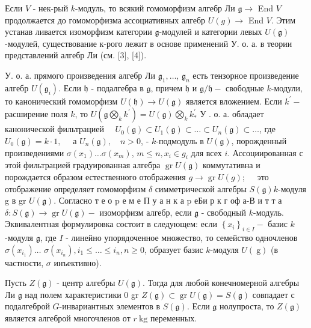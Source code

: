 \documentclass[10pt]{article}
\begin{document}
Если $V$ - нек-рый $k$-модуль, то всякий гомоморфизм алгебр Ли $\mathfrak{g} \rightarrow$ End $V$ продолжается до гомоморфизма ассоциативных алгебр $U(g) \rightarrow$ End $V$. Этим устанав ливается изоморфизм категории $\mathfrak{g}$-модулей и категории левых $U(\mathfrak{g})$-модулей, существование к-рого лежит в основе применений У. о. а. в теории представлений алгебр Ли (см. [3], [4]).



У. о. а. прямого произведения алгебр Ли $\mathfrak{g}_{1}, \ldots$, $\mathfrak{g}_{n}$ есть тензорное произведение алгебр $U\left(\mathfrak{g}_{i}\right)$. Если $\mathfrak{h}$ - подалгебра в $\mathfrak{g}$, причем $\mathfrak{h}$ и $\mathfrak{g} / \mathfrak{h}-$ свободные $k$-модули, то канонический гомоморфизм $U(\mathfrak{h}) \rightarrow U(\mathfrak{g})$ является вложением. Если $k^{\prime}-$ расширение поля $k$, то $U\left(\mathfrak{g} \bigotimes_{k} k^{\prime}\right)=U(\mathfrak{g}) \bigotimes_{k} k_{*}^{\prime}$ У . о. а. обладает канонической фильтрацией $\quad U_{0}(\mathfrak{g}) \subset U_{1}(\mathfrak{g}) \subset \ldots \subset U_{n}(\mathfrak{g}) \subset \ldots$, где $U_{0}(\mathfrak{g})=k \cdot 1, \quad$ а $U_{n}(\mathfrak{g}), \quad n>0$, - $k$-подмодуль в $U(\mathfrak{g})$, порожденный произведениями $\sigma\left(x_{1}\right) \ldots \sigma\left(x_{m}\right)$, $m \leqslant n, x_{i} \in g_{i}$ для всех $i$. Ассоциированная с этой фильтрацией градуированная алгебра $\operatorname{gr} U(\mathfrak{g})$ коммутативна и порождается образом естественного отображения $g \rightarrow \operatorname{gr} U(g) ; \quad$ это отображение определяет гомоморфизм $\delta$ симметрической алгебры $S(\mathfrak{g}) k$-модуля g в gr $U(\mathfrak{g})$. Согласно т е о p е м е П у а н к а p еБи р к г оф а-В и т т а $\delta: S(\mathfrak{g}) \rightarrow \operatorname{gr} U(\mathfrak{g})-$ изоморфизм алгебр, если $\mathfrak{g}$ - свободный $k$-модуль. Эквивалентная формулировка состоит в следующем: если $\left\{x_{i}\right\}_{i \in I}-$ базис $k$-модуля $\mathfrak{g}$, где $I$ - линейно упорядоченное множество, то семейство одночленов $\sigma\left(x_{i_{1}}\right) \ldots$ $\sigma\left(x_{i_{n}}\right), i_{1} \leqslant \ldots \leqslant i_{n}, n \geqslant 0$, образует базис $k$-модуля $U(\mathrm{~g})$ (в частности, $\sigma$ инъективно).



Пусть $Z(\mathfrak{g})$ - центр алгебры $U(\mathfrak{g})$. Тогда для любой конечномерной алгебры Ли $\mathfrak{g}$ над полем характеристики 0 gr $Z(\mathfrak{g}) \subset \operatorname{gr} U(\mathfrak{g})=S(\mathfrak{g})$ совпадает с подалгеброй $G$-инвариантных элементов в $S(\mathfrak{g})$. Если $\mathfrak{g}$ нолупроста, то $Z(\mathfrak{g})$ является алгеброй многочленов от $r \mathrm{~kg}$ переменных.
\end{document}
